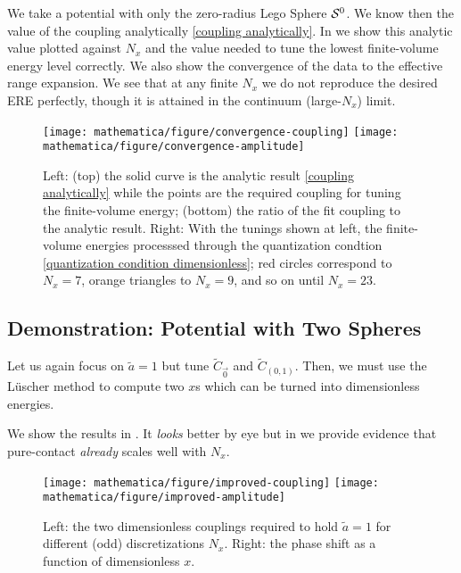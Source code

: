 We take a potential with only the zero-radius Lego Sphere $\mathcal{S}^{0}$.
We know then the value of the coupling analytically \eqref{coupling analytically}.
In  we show this analytic value plotted against $N_x$ and the value needed to tune the lowest finite-volume energy level correctly.
We also show the convergence of the data to the effective range expansion.
We see that at any finite $N_x$ we do not reproduce the desired ERE perfectly, though it is attained in the continuum (large-$N_x$) limit.

\begin{figure}
	\texttt{[image: mathematica/figure/convergence-coupling]}
	\texttt{[image: mathematica/figure/convergence-amplitude]}
	\caption{
		Left:
			(top) the solid curve is the analytic result \eqref{coupling analytically} while the points are the required coupling for tuning the finite-volume energy;
			(bottom) the ratio of the fit coupling to the analytic result.
		Right:
			With the tunings shown at left, the finite-volume energies processsed through the quantization condtion \eqref{quantization condition dimensionless}; red circles correspond to $N_x=7$, orange triangles to $N_x=9$, and so on until $N_x=23$.
	}
	\label{fig:convergence contact}
\end{figure}

\subsection{Demonstration: Potential with Two Spheres}

Let us again focus on $\tilde{a} = 1$ but tune $\tilde{C}_{\vec{0}}$ and $\tilde{C}_{(0,1)}$.
Then, we must use the L\"{u}scher method to compute two $x$s which can be turned into dimensionless energies.

We show the results in .
It \emph{looks} better by eye but in  we provide evidence that pure-contact \emph{already} scales well with $N_x$.

\begin{figure}
	\texttt{[image: mathematica/figure/improved-coupling]}
	\texttt{[image: mathematica/figure/improved-amplitude]}
	\caption{
		Left: the two dimensionless couplings required to hold $\tilde{a}=1$ for different (odd) discretizations $N_x$.
		Right: the phase shift as a function of dimensionless $x$.
	}
    \label{fig:tune two spheres}
\end{figure}

